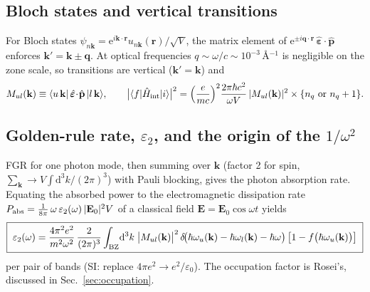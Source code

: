 \documentclass[11pt,a4paper]{article}
\numberwithin{equation}{section}
\newcommand{\hw}{\hbar\omega}
\newcommand{\eps}{\varepsilon}
\newcommand{\dd}{\mathrm{d}}
\newcommand{\fFD}{f}
\newcommand{\rme}{\mathrm{e}}
\begin{document}
\subsection{Bloch states and vertical transitions}

For Bloch states $\psi_{n\mathbf k}=\rme^{i\mathbf k\cdot\mathbf r}
u_{n\mathbf k}(\mathbf r)/\sqrt V$, the matrix element of
$\rme^{\pm i\mathbf q\cdot\mathbf r}\,\hat{\bm\eps}\!\cdot\!\hat{\mathbf p}$
enforces $\mathbf k'=\mathbf k\pm\mathbf q$.  At optical frequencies
$q\sim\omega/c\sim10^{-3}\,$\AA$^{-1}$ is negligible on the zone scale,
so transitions are vertical ($\mathbf k'=\mathbf k$) and
\begin{equation}
M_{ul}(\mathbf k)\equiv
\langle u\,\mathbf k|\,\hat{\bm\eps}\!\cdot\!\hat{\mathbf p}\,|l\,\mathbf k\rangle,
\qquad
\bigl|\langle f|\hat H_{\rm int}|i\rangle\bigr|^2
=\Bigl(\frac{e}{mc}\Bigr)^{2}\frac{2\pi\hbar c^2}{\omega V}\,
 |M_{ul}(\mathbf k)|^{2}\times\{n_q\text{ or }n_q+1\}.
\label{eq:MEsq}
\end{equation}

\subsection{Golden-rule rate, $\eps_2$, and the origin of the $1/\omega^2$}
\label{sec:eps2def}

FGR for one photon mode, then summing over $\mathbf k$ (factor 2 for
spin, $\sum_{\mathbf k}\to V\!\int\!\dd^3k/(2\pi)^3$) with Pauli
blocking, gives the photon absorption rate.  Equating the absorbed
power to the electromagnetic dissipation rate
$P_{\rm abs}=\tfrac{1}{8\pi}\,\omega\,\eps_2(\omega)\,|\mathbf E_0|^2 V$
of a classical field $\mathbf E=\mathbf E_0\cos\omega t$ yields
\begin{equation}
\boxed{\;
\eps_2(\omega)=\frac{4\pi^2 e^2}{m^2\omega^2}\,
\frac{2}{(2\pi)^3}\int_{\rm BZ}\!\dd^3k\;
\bigl|M_{ul}(\mathbf k)\bigr|^{2}\,
\delta\!\bigl(\hbar\omega_u(\mathbf k)-\hbar\omega_l(\mathbf k)-\hw\bigr)\,
\bigl[1-\fFD\bigl(\hbar\omega_u(\mathbf k)\bigr)\bigr]\; }
\label{eq:eps2exact}
\end{equation}
per pair of bands (SI: replace $4\pi e^2\to e^2/\eps_0$).  The
occupation factor is Rosei's, discussed in Sec.~\ref{sec:occupation}.
\end{document}
